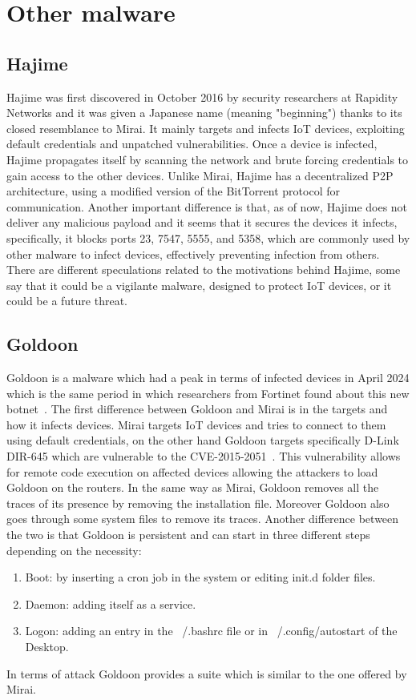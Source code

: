 \chapter{Other malware}

\section{Hajime}

Hajime was first discovered in October 2016 by security researchers at Rapidity Networks and it was given a Japanese name (meaning "beginning") thanks to its closed resemblance to Mirai. It mainly targets and infects IoT devices, exploiting default credentials and unpatched vulnerabilities. Once a device is infected, Hajime propagates itself by scanning the network and brute forcing credentials to gain access to the other devices. Unlike Mirai, Hajime has a decentralized P2P architecture, using a modified version of the BitTorrent protocol for communication. Another important difference is that, as of now, Hajime does not deliver any malicious payload and it seems that it secures the devices it infects, specifically, it blocks ports 23, 7547, 5555, and 5358, which are commonly used by other malware to infect devices, effectively preventing infection from others. There are different speculations related to the motivations behind Hajime, some say that it could be a vigilante malware, designed to protect IoT devices, or it could be a future threat.

\section{Goldoon}
Goldoon is a malware which had a peak in terms of infected devices in April 2024 which is the same period in which researchers from Fortinet found about this new botnet~\cite{fortinet-goldoon}. The first difference between Goldoon and Mirai is in the targets and how it infects devices. Mirai targets IoT devices and tries to connect to them using default credentials, on the other hand Goldoon targets specifically D-Link DIR-645 which are vulnerable to the CVE-2015-2051~\cite{CVE-2015-2051}. This vulnerability allows for remote code execution on affected devices allowing the attackers to load Goldoon on the routers. In the same way as Mirai, Goldoon removes all the traces of its presence by removing the installation file. Moreover Goldoon also goes through some system files to remove its traces. Another difference between the two is that Goldoon is persistent and can start in three different steps depending on the necessity:
\begin{enumerate}
    \item Boot: by inserting a cron job in the system or editing init.d folder files.
    \item Daemon: adding itself as a service.
    \item Logon: adding an entry in the ~/.bashrc file or in ~/.config/autostart of the Desktop.
\end{enumerate}
In terms of attack Goldoon provides a suite which is similar to the one offered by Mirai.

